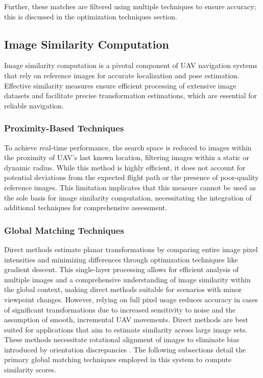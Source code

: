 Further, these matches are filtered using multiple techniques to ensure accuracy; this is discussed in the optimization techniques section.






\subsection{Image Similarity Computation}

Image similarity computation is a pivotal component of UAV navigation systems that rely on reference images for accurate localization and pose estimation. Effective similarity measures ensure efficient processing of extensive image datasets and facilitate precise transformation estimations, which are essential for reliable navigation.

\subsubsection{Proximity-Based Techniques}

To achieve real-time performance, the search space is reduced to images within the proximity of UAV's last known location, filtering images within a static or dynamic radius. While this method is highly efficient, it does not account for potential deviations from the expected flight path or the presence of poor-quality reference images. This limitation implicates that this measure cannot be used as the sole basis for image similarity computation, necessitating the integration of additional techniques for comprehensive assessment.

\subsubsection{Global Matching Techniques}

Direct methods estimate planar transformations by comparing entire image pixel intensities and minimizing differences through optimization techniques like gradient descent. This single-layer processing allows for efficient analysis of multiple images and a comprehensive understanding of image similarity within the global context, making direct methods suitable for scenarios with minor viewpoint changes. However, relying on full pixel usage reduces accuracy in cases of significant transformations due to increased sensitivity to noise and the assumption of smooth, incremental UAV movements. Direct methods are best suited for applications that aim to estimate similarity across large image sets. These methods necessitate rotational alignment of images to eliminate bias introduced by orientation discrepancies \cite{GlobalLocal2023}. The following subsections detail the primary global matching techniques employed in this system to compute similarity scores.


